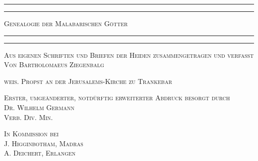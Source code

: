 \documentclass{article}
\begin{document}
\begin{titlepage} %
	\centering %


	\rule{\textwidth}{1.6pt}\vspace*{-\baselineskip}\vspace*{2pt} %
	\rule{\textwidth}{0.4pt} %
	
	\vspace{1\baselineskip} %
	
	{\scshape\Huge Genealogie der Malabarischen Götter}
	
	\vspace{1\baselineskip} %

	\rule{\textwidth}{0.4pt}\vspace*{-\baselineskip}\vspace{3.2pt} %
	\rule{\textwidth}{1.6pt} %
	
	\vspace{1\baselineskip} %
	
	
        {\scshape\small Aus eigenen Schriften und Briefen der Heiden zusammengetragen und verfasst\\\large Von \Large Bartholomaeus Ziegenbalg} 
        \vspace{1.0\baselineskip}
		
        {\scshape\small weis. Propst an der Jerusalems-Kirche zu Trankebar}
        
        \vspace{1.0\baselineskip}
        
        {\scshape\normalsize Erster, umgeänderter, notdürftig erweiterter Abdruck besorgt durch\\\large Dr. Wilhelm Germann\\\small Verb. Div. Min.} %

        \vspace{1.0\baselineskip}

        {\scshape\small In Kommission bei\\J. Higginbotham, Madras\\A. Deichert, Erlangen}
‌
        \vspace*{\fill}    


\end{titlepage}
\end{document}
